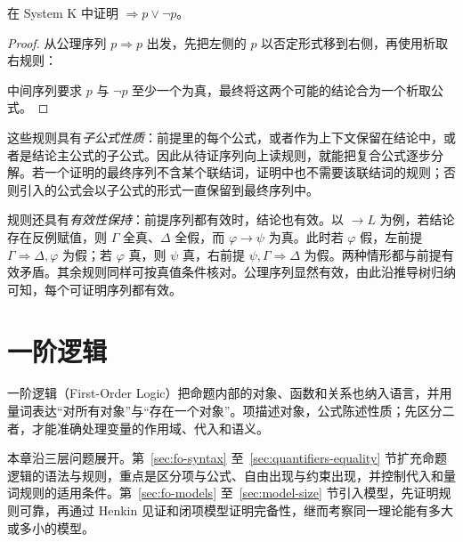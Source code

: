 \documentclass[lang=cn,a4paper,fontset=none,zihao=false,10pt,openany,twoside]{beautybook}
\numberwithin{algorithm}{chapter}
\begin{document}
\begin{example}
在 System K 中证明 $\Rightarrow p\vee\neg p$。
\end{example}
\begin{proof}
从公理序列 $p\Rightarrow p$ 出发，先把左侧的 $p$ 以否定形式移到右侧，再使用析取右规则：
\begin{prooftree}
\end{prooftree}
中间序列要求 $p$ 与 $\neg p$ 至少一个为真，最终将这两个可能的结论合为一个析取公式。
\end{proof}

\begin{remark}[规则的性质与证明搜索]
这些规则具有\emph{子公式性质}：前提里的每个公式，或者作为上下文保留在结论中，或者是结论主公式的子公式。因此从待证序列向上读规则，就能把复合公式逐步分解。若一个证明的最终序列不含某个联结词，证明中也不需要该联结词的规则；否则引入的公式会以子公式的形式一直保留到最终序列中。

规则还具有\emph{有效性保持}：前提序列都有效时，结论也有效。以 $\to L$ 为例，若结论存在反例赋值，则 $\Gamma$ 全真、$\Delta$ 全假，而 $\varphi\to\psi$ 为真。此时若 $\varphi$ 假，左前提 $\Gamma\Rightarrow\Delta,\varphi$ 为假；若 $\varphi$ 真，则 $\psi$ 真，右前提 $\psi,\Gamma\Rightarrow\Delta$ 为假。两种情形都与前提有效矛盾。其余规则同样可按真值条件核对。公理序列显然有效，由此沿推导树归纳可知，每个可证明序列都有效。
\end{remark}

\chapter{一阶逻辑}\label{chap:first-order-logic}
\begin{wenxintishi}
一阶逻辑（First-Order Logic）把命题内部的对象、函数和关系也纳入语言，并用量词表达“对所有对象”与“存在一个对象”。项描述对象，公式陈述性质；先区分二者，才能准确处理变量的作用域、代入和语义。
\end{wenxintishi}

本章沿三层问题展开。第~\ref{sec:fo-syntax} 至~\ref{sec:quantifiers-equality} 节扩充命题逻辑的语法与规则，重点是区分项与公式、自由出现与约束出现，并控制代入和量词规则的适用条件。第~\ref{sec:fo-models} 至~\ref{sec:model-size} 节引入模型，先证明规则可靠，再通过 Henkin 见证和闭项模型证明完备性，继而考察同一理论能有多大或多小的模型。
\end{document}
